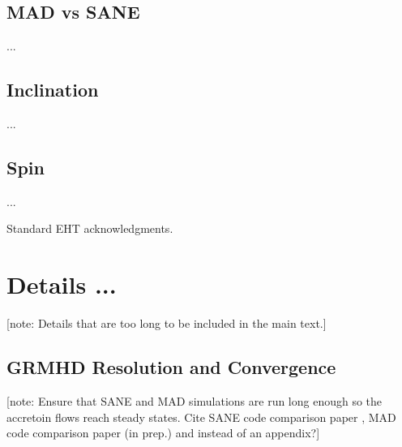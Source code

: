 \documentclass[twocolumn,tighten,dvipsnames]{aastex63}
\newcommand\note[1]{{\color{OliveGreen}[note: #1]}}
\begin{document}
\subsection{MAD vs SANE}

...

\subsection{Inclination}

...

\subsection{Spin}

...

\acknowledgments

Standard EHT acknowledgments.

\vspace{5mm}



\appendix

\section{Details ...}
\label{sec:details}

\note{Details that are too long to be included in the main text.}

\subsection{GRMHD Resolution and Convergence}
\label{sec:converge}

\note{Ensure that SANE and MAD simulations are run long enough so the
  accretoin flows reach steady states.
  Cite SANE code comparison paper \citep{2019ApJS..243...26P}, MAD
  code comparison paper (in prep.) and \citet{2012MNRAS.426.3241N,
    2013MNRAS.436.3856S} instead of an appendix?}
\end{document}
